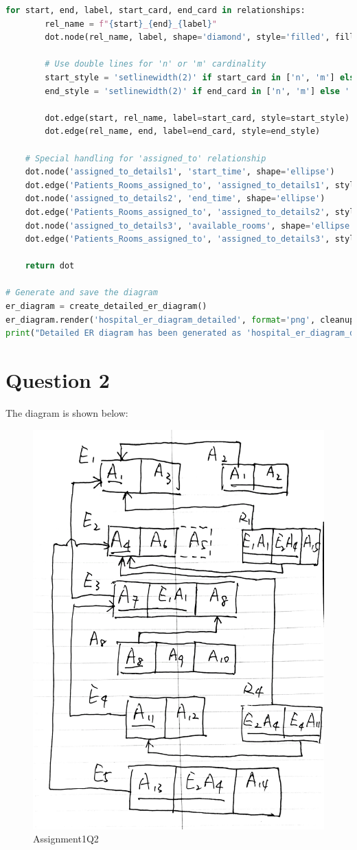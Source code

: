 \documentclass{article}
\begin{document}
\begin{lstlisting}[language=Python, caption=Python code for generating the ER diagram]
    for start, end, label, start_card, end_card in relationships:
        rel_name = f"{start}_{end}_{label}"
        dot.node(rel_name, label, shape='diamond', style='filled', fillcolor='lightyellow')
        
        # Use double lines for 'n' or 'm' cardinality
        start_style = 'setlinewidth(2)' if start_card in ['n', 'm'] else ''
        end_style = 'setlinewidth(2)' if end_card in ['n', 'm'] else ''
        
        dot.edge(start, rel_name, label=start_card, style=start_style)
        dot.edge(rel_name, end, label=end_card, style=end_style)

    # Special handling for 'assigned_to' relationship
    dot.node('assigned_to_details1', 'start_time', shape='ellipse')
    dot.edge('Patients_Rooms_assigned_to', 'assigned_to_details1', style='solid')
    dot.node('assigned_to_details2', 'end_time', shape='ellipse')
    dot.edge('Patients_Rooms_assigned_to', 'assigned_to_details2', style='solid')
    dot.node('assigned_to_details3', 'available_rooms', shape='ellipse')
    dot.edge('Patients_Rooms_assigned_to', 'assigned_to_details3', style='solid')

    return dot

# Generate and save the diagram
er_diagram = create_detailed_er_diagram()
er_diagram.render('hospital_er_diagram_detailed', format='png', cleanup=True)
print("Detailed ER diagram has been generated as 'hospital_er_diagram_detailed.png'")
\end{lstlisting}


\section*{Question 2}
The diagram is shown below:

\begin{figure}[h]
    \centering
    \includegraphics[width=0.5\linewidth]{Assignment1Q2.jpg}
    \caption{Assignment1Q2}
    \label{Assignment1Q2}
\end{figure}
\end{document}
